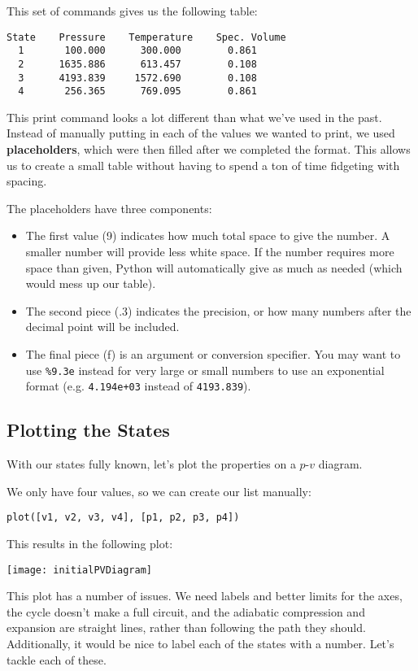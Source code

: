 This set of commands gives us the following table:
\begin{verbatim}
State    Pressure    Temperature    Spec. Volume
  1       100.000      300.000        0.861
  2      1635.886      613.457        0.108
  3      4193.839     1572.690        0.108
  4       256.365      769.095        0.861
\end{verbatim}

This print command looks a lot different than what we've used in the past.  Instead of manually putting in each of the values we wanted to print, we used {\bf placeholders}, which were then filled after we completed the format.  This allows us to create a small table without having to spend a ton of time fidgeting with spacing.

The placeholders have three components:
\begin{itemize}
\item The first value (9) indicates how much total space to give the number.  A smaller number will provide less white space.  If the number requires more space than given, Python will automatically give as much as needed (which would mess up our table).
\item The second piece (.3) indicates the precision, or how many numbers after the decimal point will be included.
\item The final piece (f) is an argument or conversion specifier.  You may want to use \verb~%9.3e~ instead for very large or small numbers to use an exponential format (e.g. \verb~4.194e+03~ instead of \verb~4193.839~).
\end{itemize}

\subsection{Plotting the States}
With our states fully known, let's plot the properties on a $p$-$v$ diagram.

We only have four values, so we can create our list manually:

\begin{verbatim}
plot([v1, v2, v3, v4], [p1, p2, p3, p4])
\end{verbatim}

This results in the following plot:
\begin{center}
\texttt{[image: initialPVDiagram]}
\end{center}

This plot has a number of issues.  We need labels and better limits for the axes, the cycle doesn't make a full circuit, and the adiabatic compression and expansion are straight lines, rather than following the path they should.
Additionally, it would be nice to label each of the states with a number.  Let's tackle each of these.
